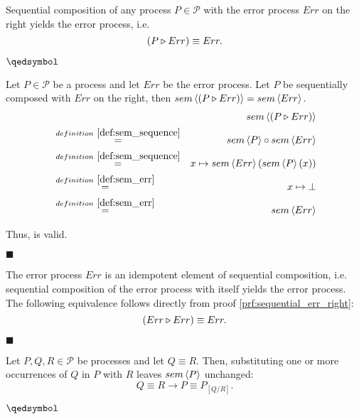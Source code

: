\begin{theorem}
\label{thm:sequential_err_right}
Sequential composition of any process $P \in \mathcal{P}$ with the error process $Err$ on the right yields the error process, i.e.
\begin{equation*}
  \left( P \triangleright Err \right) \equiv Err.
\end{equation*}

\hfill$\qedsymbol$
\end{theorem}


\begin{myproof}
\label{prf:sequential_err_right}
Let $P \in \mathcal{P}$ be a process and let $Err$ be the error process. Let $P$ be sequentially composed with $Err$ on the right, then $sem \left\langle \left( P \triangleright Err \right) \right\rangle = sem \left\langle Err \right\rangle$.
\begin{eqnarray*}
  & & \sem{\sequence{P}{Err}} \\
    & \overset{\defref{def:sem_sequence}}{=} & \sem{P} \circ \sem{Err} \\
    & \overset{\defref{def:sem_sequence}}{=} & x \mapsto \sem{Err} \left( \sem{P} \left( x \right) \right) \\
    & \overset{\defref{def:sem_err}}{=} & x \mapsto \bot \\
    & \overset{\defref{def:sem_err}}{=} & \sem{Err}
\end{eqnarray*}

Thus,  is valid.

\hfill$\blacksquare$
\end{myproof}


\begin{corollary}
\label{thm:idempotence_err}
The error process $Err$ is an idempotent element of sequential composition, i.e. sequential composition of the error process with itself yields the error process. The following equivalence follows directly from proof \ref{prf:sequential_err_right}:
\begin{equation*}
  \left( Err \triangleright Err \right) \equiv Err.
\end{equation*}

\hfill$\blacksquare$
\end{corollary}


\begin{theorem}
\label{thm:substitution_equivalence}
Let $P, Q, R \in \mathcal{P}$ be processes and let $Q \equiv R$. Then, substituting one or more occurrences of $Q$ in $P$ with $R$ leaves $sem \left\langle P \right\rangle$ unchanged:
  \begin{equation*}
    Q \equiv R \rightarrow P \equiv P_{\left[ Q / R \right]}.
  \end{equation*}
  
  \hfill$\qedsymbol$
\end{theorem}

